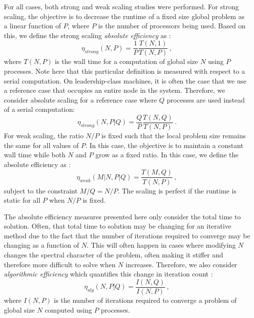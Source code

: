 \documentclass{snamc2013}
\begin{document}
For all cases, both strong and weak scaling studies were
performed. For strong scaling, the objective is to decrease the
runtime of a fixed size global problem as a linear function of $P$,
where $P$ is the number of processors being used. Based on this, we
define the strong scaling \textit{absolute efficiency} as
\cite{keyes_how_1999}:
\begin{equation}
  \eta_{strong}(N,P) = \frac{1}{P} \frac{T(N,1)}{T(N,P)}\:,
  \label{eq:strong_scaling_absolute}
\end{equation}
where $T(N,P)$ is the wall time for a computation of global size $N$
using $P$ processes. Note here that this particular definition is
measured with respect to a serial computation. On leadership-class
machines, it is often the case that we use a reference case that
occupies an entire node in the system. Therefore, we consider absolute
scaling for a reference case where $Q$ processes are used instead of a
serial computation:
\begin{equation}
  \eta_{strong}(N,P|Q) = \frac{Q}{P} \frac{T(N,Q)}{T(N,P)}\:.
  \label{eq:strong_scaling_absolute_ref}
\end{equation}
For weak scaling, the ratio $N/P$ is fixed such that the local problem
size remains the same for all values of $P$. In this case, the
objective is to maintain a constant wall time while both $N$ and $P$
grow as a fixed ratio. In this case, we define the absolute efficiency
as \cite{keyes_how_1999}:
\begin{equation}
  \eta_{weak}(M|N,P|Q) = \frac{T(M,Q)}{T(N,P)}\:,
  \label{eq:weak_scaling_absolute}
\end{equation}
subject to the constraint $M/Q = N/P$. The scaling is perfect if the
runtime is static for all $P$ when $N/P$ is fixed.  

The absolute efficiency measures presented here only consider the
total time to solution. Often, that total time to solution may be
changing for an iterative method due to the fact that the number of
iterations required to converge may be changing as a function of
$N$. This will often happen in cases where modifying $N$ changes the
spectral character of the problem, often making it stiffer and
therefore more difficult to solve when $N$ increases. Therefore, we
also consider \textit{algorithmic efficiency} which quantifies this
change in iteration count \cite{keyes_how_1999}:
\begin{equation}
  \eta_{alg}(N,P|Q) = \frac{I(N,Q)}{I(N,P)}\:,
  \label{eq:algorithmic_efficiency}
\end{equation}
where $I(N,P)$ is the number of iterations required to converge a
problem of global size $N$ computed using $P$ processes.
\end{document}
